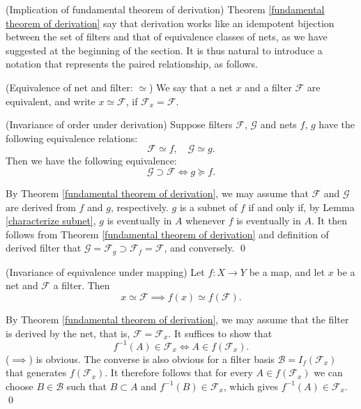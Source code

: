 \documentclass{report}
\begin{document}
\begin{rem} (Implication of fundamental theorem of derivation)
    Theorem \ref{fundamental theorem of derivation} say that derivation works like an idempotent bijection between the set of filters and that of equivalence classes of nets, as we have suggested at the beginning of the section. It is thus natural to introduce a notation that represents the paired relationship, as follows.
\end{rem}

\begin{dfn} (Equivalence of net and filter: \( \simeq \))
    We say that a net \( x \) and a filter \( \mathscr{F} \) are equivalent, and write \( x \simeq \mathscr{F} \), if \( \mathscr{F}_x = \mathscr{F} \).
\end{dfn}

\begin{cor} (Invariance of order under derivation)\label{invariance order}
    Suppose filters \( \mathscr{F} \), \( \mathscr{G} \) and nets \( f \), \( g \) have the following equivalence relations:
    \[
        \mathscr{F} \simeq f,\quad \mathscr{G} \simeq g.
    \]
    Then we have the following equivalence:
    \[
        \mathscr{G} \supset \mathscr{F} \iff g \succeq f.
    \]
\end{cor}
\begin{prf}
    By Theorem \ref{fundamental theorem of derivation}, we may assume that \( \mathscr{F} \) and \( \mathscr{G} \) are derived from \( f \) and \( g \), respectively. \( g \) is a subnet of \( f \) if and only if, by Lemma \ref{characterize subnet}, \( g \) is eventually in \( A \) whenever \( f \) is eventually in \( A \).
    It then follows from Theorem \ref{fundamental theorem of derivation} and definition of derived filter that \( \mathscr{G} = \mathscr{F}_g \supset \mathscr{F}_f = \mathscr{F} \), and conversely.
    \qed\end{prf}

\begin{prp}\label{invariance under mapping} (Invariance of equivalence under mapping)
    Let \( f:X \to Y \) be a map, and let \( x \) be a net and \( \mathscr{F} \) a filter. Then
    \[
        x \simeq \mathscr{F} \implies f(x)\simeq f(\mathscr{F}).
    \]
\end{prp}
\begin{prf}
    By Theorem \ref{fundamental theorem of derivation}, we may assume that the filter is derived by the net, that is, \( \mathscr{F} = \mathscr{F}_x \).
    It suffices to show that
    \begin{equation*}
        f^{-1}(A)\in \mathscr{F}_x \iff A \in f(\mathscr{F}_x).
    \end{equation*}
    (\( \implies \)) is obvious. The converse is also obvious for a filter basis \( \mathscr{B}=I_f(\mathscr{F}_x) \) that generates \( f(\mathscr{F}_x) \). It therefore follows that for every \( A \in f(\mathscr{F}_x)\) we can choose \( B \in \mathscr{B} \) such that \( B \subset A \) and \( f^{-1}(B) \in \mathscr{F}_x \), which gives \( f^{-1}(A) \in \mathscr{F}_x \).
    \qed\end{prf}
\end{document}
